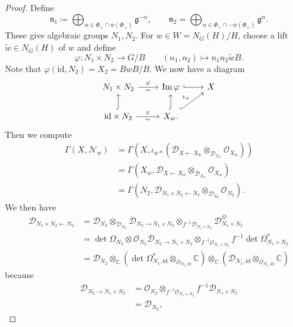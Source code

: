 \documentclass[leqno, openany]{memoir}
\theoremstyle{definition}
\theoremstyle{remark}
\theoremstyle{plain}
\theoremstyle{definition}
\theoremstyle{remark}
\newcommand{\C}{\mathbb{C}}
\newcommand{\g}{\mathfrak{g}}
\newcommand{\mc}[1]{\mathcal{#1}}
\newcommand{\mf}[1]{\mathfrak{#1}}
\newcommand{\mr}[1]{\mathrm{#1}}
\newcommand{\wt}[1]{\widetilde{#1}}
\begin{document}
\begin{proof}
    Define
    \[ \mf{n}_1 \coloneqq \bigoplus_{\alpha \in \Phi_+ \cap w(\Phi_+)} \g^{-\alpha}, \qquad \mf{n}_2 = \bigoplus_{\alpha \in \Phi_+ \cap -w(\Phi_+)} \g^{\alpha}. \]
    These give algebraic groups $N_1, N_2$. For $w \in W = N_G(H)/H$, choose a lift $\wt{w} \in N_G(H)$ of $w$ and define
    \[ \varphi \colon N_1 \times N_2 \to G/B \qquad (n_1, n_2) \mapsto n_1 n_2 \wt{w} B. \]
    Note that $\varphi(\mr{id}, N_2) = X_2 = BwB / B$. We now have a diagram
    \begin{equation*}
    \begin{tikzcd}
        N_1 \times N_2 \ar{r}{\varphi}[swap]{\sim} & \Im \varphi \ar[hookrightarrow]{r} & X \\
        \mr{id} \times N_2 \ar[hookrightarrow]{u} \ar{r}{\varphi}[swap]{\sim} & X_w \ar[hookrightarrow]{u} \ar[hookrightarrow]{ur}{\iota_w}.
    \end{tikzcd}
    \end{equation*}
    Then we compute
    \begin{align*}
        \Gamma(X, \mc{N}_w) &= \Gamma(X, \iota_{w*}(\mc{D}_{X \gets X_w} \otimes_{\mc{D}_{X_w}} \mc{O}_{X_w})) \\
        &= \Gamma(X_w, \mc{D}_{X \gets X_w} \otimes_{\mc{D}_{X_w}} \mc{O}_{X_w}) \\
        &= \Gamma(N_2, \mc{D}_{N_1 \times N_2 \gets N_2} \otimes_{\mc{D}_{N_2}} \mc{O}_{N_2}).
    \end{align*}
    We then have
    \begin{align*}
        \mc{D}_{N_1 \times N_2 \gets N_2} &= \mc{D}_{N_2} \otimes_{\mc{D}_{N_2}} \mc{D}_{N_2 \to N_1 \times N_2} \otimes_{f^{-1} \mc{D}_{N_1 \times N_2}} \mc{D}_{N_1 \times N_2}^{\Omega} \\
        &= \det \Omega_{N_2} \otimes \mc{O}_{N_2} \mc{D}_{N_2 \to N_1 \times N_2} \otimes_{f^{-1} \mc{O}_{N_1 \times N_2}} f^{-1} \det \Omega_{N_1 \times N_2}^* \\
        &= \mc{D}_{N_2} \otimes_{\C} (\det \Omega_{N_1, \mr{id}}^* \otimes_{\mc{O}_{N_1, \mr{id}}} \C) \otimes_{\C} (\mc{D}_{N_1, \mr{id}} \otimes_{\mc{O}_{N_1, \mr{id}}} \C)
    \end{align*}
    because
    \begin{align*}
        \mc{D}_{N_2 \to N_1 \times N_2} &= \mc{O}_{N_2} \otimes_{f^{-1} \mc{O}_{N_1 \times N_2}} f^{-1} \mc{D}_{N_1 \times N_2} \\
        &= \mc{D}_{N_2},
    \end{align*}

\end{proof}
\end{document}

